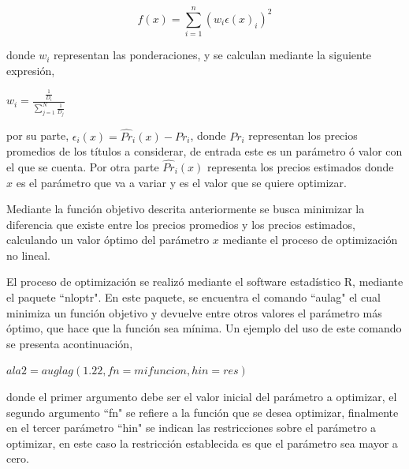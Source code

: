 \begin{equation}\label{ecua2}
  f(x) = \sum_{i=1}^{n} (w_{i}\epsilon(x)_{i} )^2
\end{equation}


\noindent donde $w_{i}$ representan las ponderaciones, y se calculan mediante la siguiente expresi\'on,

\vspace{0.2cm}


\begin{center}

$\displaystyle{w_{i} = \frac{\frac{1}{D_{i}}}{\sum_{j=1}^{N}\frac{1}{D_{j}}}}$

\end{center}


\vspace{0.2cm}


\noindent por su parte, $\epsilon_{i}(x)= \hat{Pr}_{i}(x)-Pr_{i}$, donde $Pr_{i}$ representan los precios promedios de los t\'itulos a considerar, de entrada este es un par\'ametro \'o valor con el que se cuenta. Por otra parte $\hat{Pr}_{i}(x)$ representa los precios estimados donde $x$ es el par\'ametro que va a variar y es el valor que se quiere optimizar.


\hspace{0.4cm} Mediante la funci\'on objetivo descrita anteriormente se busca minimizar la diferencia que existe entre los precios promedios y los precios estimados, calculando un valor \'optimo del par\'ametro $x$ mediante el proceso de optimizaci\'on no lineal.



\hspace{0.4cm}El proceso de optimizaci\'on se realiz\'o mediante el software estad\'istico R, mediante el paquete ``nloptr". En este paquete, se encuentra el comando ``aulag" el cual minimiza un funci\'on objetivo y devuelve entre otros valores el par\'ametro m\'as \'optimo, que hace que la funci\'on sea m\'inima. Un ejemplo del uso de este comando se presenta acontinuaci\'on,

\begin{center}
  $ala2=auglag(1.22, fn=mifuncion, hin=res)$
\end{center}


\noindent donde el primer argumento debe ser el valor inicial del par\'ametro a optimizar, el segundo argumento ``fn" se refiere a la funci\'on que se desea optimizar, finalmente en el tercer par\'ametro ``hin" se indican las restricciones sobre el par\'ametro a optimizar, en este caso la restricci\'on establecida es que el par\'ametro sea mayor a cero.


